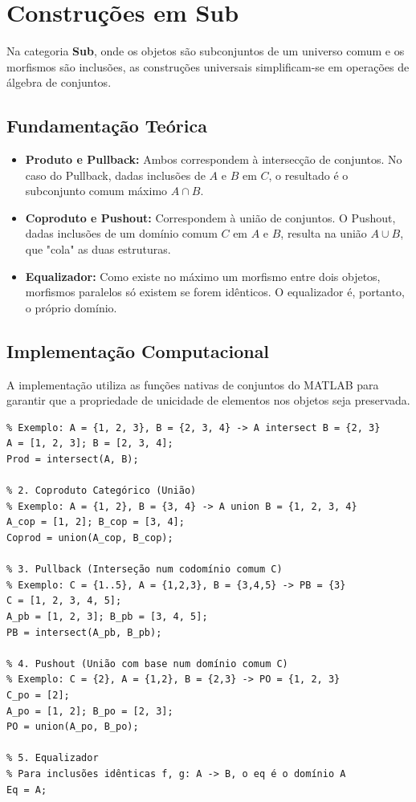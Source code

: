 \section{Construções em Sub}

Na categoria \textbf{Sub}, onde os objetos são subconjuntos de um universo comum e os morfismos são inclusões, as construções universais simplificam-se em operações de álgebra de conjuntos.

\subsection{Fundamentação Teórica}
\begin{itemize}
    \item \textbf{Produto e Pullback:} Ambos correspondem à intersecção de conjuntos. No caso do Pullback, dadas inclusões de $A$ e $B$ em $C$, o resultado é o subconjunto comum máximo $A \cap B$.
    \item \textbf{Coproduto e Pushout:} Correspondem à união de conjuntos. O Pushout, dadas inclusões de um domínio comum $C$ em $A$ e $B$, resulta na união $A \cup B$, que "cola" as duas estruturas.
    \item \textbf{Equalizador:} Como existe no máximo um morfismo entre dois objetos, morfismos paralelos só existem se forem idênticos. O equalizador é, portanto, o próprio domínio.
\end{itemize}

\subsection{Implementação Computacional}
A implementação utiliza as funções nativas de conjuntos do MATLAB para garantir que a propriedade de unicidade de elementos nos objetos seja preservada.

\begin{lstlisting}[caption={Operações de Conjuntos em Sub}]
% 1. Produto Categórico (Interseção)
% Exemplo: A = {1, 2, 3}, B = {2, 3, 4} -> A intersect B = {2, 3}
A = [1, 2, 3]; B = [2, 3, 4];
Prod = intersect(A, B);

% 2. Coproduto Categórico (União)
% Exemplo: A = {1, 2}, B = {3, 4} -> A union B = {1, 2, 3, 4}
A_cop = [1, 2]; B_cop = [3, 4];
Coprod = union(A_cop, B_cop);

% 3. Pullback (Interseção num codomínio comum C)
% Exemplo: C = {1..5}, A = {1,2,3}, B = {3,4,5} -> PB = {3}
C = [1, 2, 3, 4, 5];
A_pb = [1, 2, 3]; B_pb = [3, 4, 5];
PB = intersect(A_pb, B_pb);

% 4. Pushout (União com base num domínio comum C)
% Exemplo: C = {2}, A = {1,2}, B = {2,3} -> PO = {1, 2, 3}
C_po = [2];
A_po = [1, 2]; B_po = [2, 3];
PO = union(A_po, B_po);

% 5. Equalizador
% Para inclusões idênticas f, g: A -> B, o eq é o domínio A
Eq = A;
\end{lstlisting}